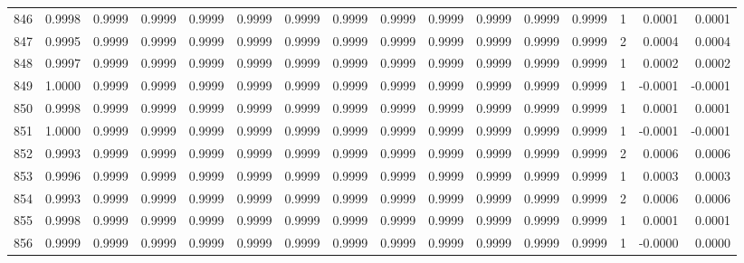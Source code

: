 \begin{tabular}{lrrrrrrrrrrrrrrr}
846 &      0.9998 &  0.9999 &  0.9999 &  0.9999 &  0.9999 &  0.9999 &  0.9999 &  0.9999 &  0.9999 &  0.9999 &   0.9999 &     0.9999 &      1 &                    0.0001 &                     0.0001 \\
847 &      0.9995 &  0.9999 &  0.9999 &  0.9999 &  0.9999 &  0.9999 &  0.9999 &  0.9999 &  0.9999 &  0.9999 &   0.9999 &     0.9999 &      2 &                    0.0004 &                     0.0004 \\
848 &      0.9997 &  0.9999 &  0.9999 &  0.9999 &  0.9999 &  0.9999 &  0.9999 &  0.9999 &  0.9999 &  0.9999 &   0.9999 &     0.9999 &      1 &                    0.0002 &                     0.0002 \\
849 &      1.0000 &  0.9999 &  0.9999 &  0.9999 &  0.9999 &  0.9999 &  0.9999 &  0.9999 &  0.9999 &  0.9999 &   0.9999 &     0.9999 &      1 &                   -0.0001 &                    -0.0001 \\
850 &      0.9998 &  0.9999 &  0.9999 &  0.9999 &  0.9999 &  0.9999 &  0.9999 &  0.9999 &  0.9999 &  0.9999 &   0.9999 &     0.9999 &      1 &                    0.0001 &                     0.0001 \\
851 &      1.0000 &  0.9999 &  0.9999 &  0.9999 &  0.9999 &  0.9999 &  0.9999 &  0.9999 &  0.9999 &  0.9999 &   0.9999 &     0.9999 &      1 &                   -0.0001 &                    -0.0001 \\
852 &      0.9993 &  0.9999 &  0.9999 &  0.9999 &  0.9999 &  0.9999 &  0.9999 &  0.9999 &  0.9999 &  0.9999 &   0.9999 &     0.9999 &      2 &                    0.0006 &                     0.0006 \\
853 &      0.9996 &  0.9999 &  0.9999 &  0.9999 &  0.9999 &  0.9999 &  0.9999 &  0.9999 &  0.9999 &  0.9999 &   0.9999 &     0.9999 &      1 &                    0.0003 &                     0.0003 \\
854 &      0.9993 &  0.9999 &  0.9999 &  0.9999 &  0.9999 &  0.9999 &  0.9999 &  0.9999 &  0.9999 &  0.9999 &   0.9999 &     0.9999 &      2 &                    0.0006 &                     0.0006 \\
855 &      0.9998 &  0.9999 &  0.9999 &  0.9999 &  0.9999 &  0.9999 &  0.9999 &  0.9999 &  0.9999 &  0.9999 &   0.9999 &     0.9999 &      1 &                    0.0001 &                     0.0001 \\
856 &      0.9999 &  0.9999 &  0.9999 &  0.9999 &  0.9999 &  0.9999 &  0.9999 &  0.9999 &  0.9999 &  0.9999 &   0.9999 &     0.9999 &      1 &                   -0.0000 &                     0.0000 \\

\end{tabular}
